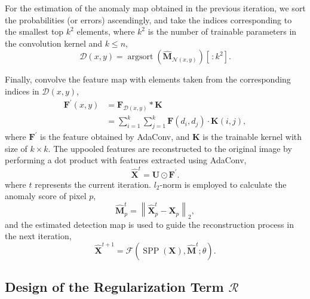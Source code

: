 For the estimation of the anomaly map obtained in the previous iteration, we sort the probabilities (or errors) ascendingly, and take the indices corresponding to the smallest top $k^2$ elements, where $k^2$ is the number of trainable parameters in the convolution kernel and $k \leq n$,
\begin{equation}
    \mathcal{D}(x,y)=\operatorname{argsort} (\hat{\mathrm{\mathbf{M}}}_{\mathcal{N}(x,y)})[\,:k^2].
\end{equation}
\vspace{-3mm}

Finally, convolve the feature map with elements taken from the corresponding indices in $\mathcal{D}(x,y)$,
\begin{equation}
    \begin{aligned}
    \mathrm{\mathbf{F}}^{\prime}(x,y)&=\mathrm{\mathbf{F}}_{\mathcal{D}(x,y)}  \ast \mathrm{\mathbf{K}}  \\
    &= \sum_{i=1}^{k} \sum_{j=1}^{k}  \mathrm{\mathbf{F}}(d_i,d_j)   \cdot  \mathrm{\mathbf{K}}(i,j),
\end{aligned}
\end{equation}
where $ \mathrm{\mathbf{F}}^{\prime}$ is the feature obtained by AdaConv, and $\mathrm{\mathbf{K}}$ is the trainable kernel with size of $k \times k$. The uppooled features are reconstructed to the original image by performing a dot product with features extracted using AdaConv,
\begin{equation}
    \hat{\mathrm{\mathbf{X}}}^t=\mathrm{\mathbf{U}} \odot \mathrm{\mathbf{F}}^{\prime}.
\end{equation}
where $t$ represents the current iteration. $l_2$-norm is employed to calculate the anomaly score of pixel $p$, 
\begin{equation}
    \hat{\mathrm{\mathbf{M}}}_p^{t}=\left\|\hat{\mathrm{\mathbf{X}}}_p^{t}-\mathrm{\mathbf{X}}_p\right\|_{2},
\end{equation}
and the estimated detection map is used to guide the reconstruction process in the next iteration,
\begin{equation}
    \hat{\mathrm{\mathbf{X}}}^{t+1}=\mathcal{F}( \operatorname{SPP}(\mathrm{\mathbf{X}}), \hat{\mathrm{\mathbf{M}}}^{t}; \theta ).
\end{equation}
\vspace{-3mm}





\subsection{Design of the Regularization Term $\mathcal{R}$}

